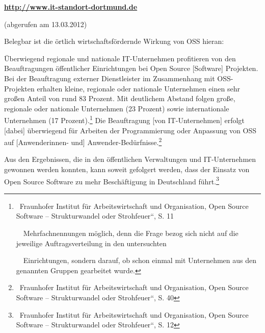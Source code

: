 \documentclass[a4paper]{article}
\newcommand\textstyleInternetlink[1]{\foreignlanguage{english}{\textcolor[rgb]{0.0,0.0,0.5019608}{#1}}}
\newcommand\textstyleFunotenzeicheni[1]{\textsuperscript{#1}}
\begin{document}
\bigskip

{\centering{}
\href{http://www.it-standort-dortmund.de/}{\textstyleInternetlink{\textbf{http://}}}\href{http://www.it-standort-dortmund.de/}{\textstyleInternetlink{\textbf{www.it-standort-dortmund.de}}}
\par}

{\centering{}
\foreignlanguage{english}{(abgerufen}\foreignlanguage{english}{
}\foreignlanguage{english}{am}\foreignlanguage{english}{
}\foreignlanguage{english}{13.03.2012)}
\par}


\bigskip

{
Belegbar ist die \"ortlich wirtschaftsf\"ordernde Wirkung von OSS
hieran:}

{
{\guillemotright}\"Uberwiegend regionale und nationale IT-Unternehmen
profitieren von den Beauftragungen \"offentlicher Einrichtungen bei
Open Source [Software] Projekten. Bei der Beauftragung externer
Dienstleister im Zusammenhang mit OSS-Projekten erhalten kleine,
regionale oder nationale Unternehmen einen sehr gro{\ss}en Anteil von
rund 83 Prozent. Mit deutlichem Abstand folgen gro{\ss}e, regionale
oder nationale Unternehmen (23 Prozent) sowie internationale
Unternehmen (17 Prozent).{\guillemotleft}\footnote{\ Fraunhofer
Institut f\"ur Arbeitswirtschaft und Organisation, {\quotedblbase}Open
Source Software -- Strukturwandel oder Strohfeuer{\textquotedblleft},
S. 11\par \ \ Mehrfachnennungen m\"oglich, denn die Frage bezog sich
nicht auf die jeweilige Auftragsverteilung in den untersuchten\par
\ \ Einrichtungen, sondern darauf, ob schon einmal mit Unternehmen aus
den genannten Gruppen gearbeitet wurde.}\textstyleFunotenzeicheni{
}{\guillemotright}Die Beauftragung [von IT-Unternehmen] erfolgt [dabei]
\"uberwiegend f\"ur Arbeiten der Programmierung oder Anpassung von OSS
auf [Anwenderinnen- und]
Anwender-Bed\"urfnisse.{\guillemotleft}\footnote{\ Fraunhofer Institut
f\"ur Arbeitswirtschaft und Organisation, {\quotedblbase}Open Source
Software -- Strukturwandel oder Strohfeuer{\textquotedblleft}, S. 40}}

{
{\guillemotright}Aus den Ergebnissen, die in den \"offentlichen
Verwaltungen und IT-Unternehmen gewonnen werden konnten, kann soweit
gefolgert werden, dass der Einsatz von Open Source Software zu mehr
Besch\"aftigung in Deutschland
f\"uhrt.{\guillemotleft}\footnote{\ Fraunhofer Institut f\"ur
Arbeitswirtschaft und Organisation, {\quotedblbase}Open Source Software
-- Strukturwandel oder Strohfeuer{\textquotedblleft}, S. 12}}
\end{document}
